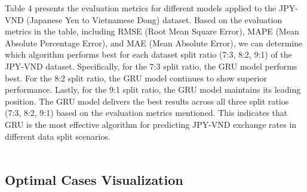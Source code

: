 \documentclass{ieeeojies}
\begin{document}
Table 4 presents the evaluation metrics for different models applied to the JPY-VND (Japanese Yen to Vietnamese Dong) dataset. Based on the evaluation metrics in the table, including RMSE (Root Mean Square Error), MAPE (Mean Absolute Percentage Error), and MAE (Mean Absolute Error), we can determine which algorithm performs best for each dataset split ratio (7:3, 8:2, 9:1) of the JPY-VND dataset. Specifically, for the 7:3 split ratio, the GRU model performs best. For the 8:2 split ratio, the GRU model continues to show superior performance. Lastly, for the 9:1 split ratio, the GRU model maintains its leading position. The GRU model delivers the best results across all three split ratios (7:3, 8:2, 9:1) based on the evaluation metrics mentioned. This indicates that GRU is the most effective algorithm for predicting JPY-VND exchange rates in different data split scenarios.\\
\\

\subsection{Optimal Cases Visualization} 
\end{document}
